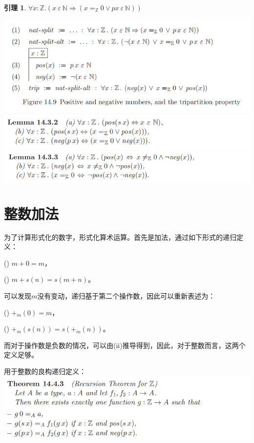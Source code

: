 \documentclass[UTF8]{article}
\newtheorem{lemma}[thm]{引理}
\newcommand{\rmnum}[1]{\romannumeral #1}
\begin{document}
		\begin{lemma} $\forall x:\mathbb{Z}.(x\ \varepsilon\ \mathbb{N}\Rightarrow(x=_{\mathbb{Z}}0\lor px\ \varepsilon\ \mathbb{N}))$
		\end{lemma}
	
		\noindent\includegraphics[width=0.93\linewidth]{"../imgs/14-4.png"}\\
		\includegraphics[width=0.93\linewidth]{"../imgs/14-5.png"}\\
		\includegraphics[width=0.93\linewidth]{"../imgs/14-6.png"}
	
	\section{整数加法}
	\noindent
	为了计算形式化的数字，形式化算术运算。首先是加法，通过如下形式的递归定义：
	
		(\rmnum{1}) $m + 0 = m$，
		
		(\rmnum{2}) $m + s(n) = s(m + n)$。
		
		可以发现$m$没有变动，递归基于第二个操作数，因此可以重新表述为：
		
		(\rmnum{1}) $+_m(0)=m$，
		
		(\rmnum{2}) $+_m(s(n))=s(+_m(n))$。
		
		而对于操作数是负数的情况，可以由(ii)推导得到，因此，对于整数而言，这两个定义足够。
		
		用于整数的良构递归定义：\\
		\includegraphics[width=0.93\linewidth]{"../imgs/14-7.png"}
		
\end{document}
